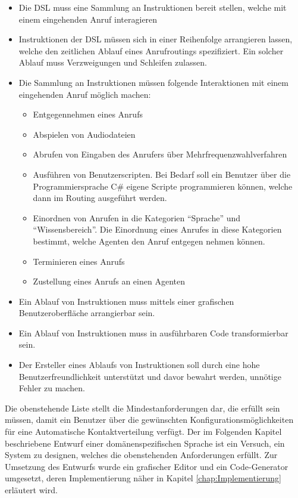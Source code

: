 \begin{itemize}
\item Die DSL muss eine Sammlung an Instruktionen bereit stellen, welche mit einem eingehenden Anruf interagieren
\item Instruktionen der DSL müssen sich in einer Reihenfolge arrangieren lassen, welche den zeitlichen Ablauf eines Anrufroutings spezifiziert. Ein solcher Ablauf muss Verzweigungen und Schleifen zulassen.
\item Die Sammlung an Instruktionen müssen folgende Interaktionen mit einem eingehenden Anruf möglich machen:
	\begin{itemize}
	\item Entgegennehmen eines Anrufs
	\item Abspielen von Audiodateien 
	\item Abrufen von Eingaben des Anrufers über Mehrfrequenzwahlverfahren
	\item Ausführen von Benutzerscripten. Bei Bedarf soll ein Benutzer über die Programmiersprache C\# eigene Scripte programmieren können, welche dann im Routing ausgeführt werden.
	\item Einordnen von Anrufen in die Kategorien ``Sprache'' und ``Wissensbereich''. Die Einordnung eines Anrufes in diese Kategorien bestimmt, welche Agenten den Anruf entgegen nehmen können.
	\item Terminieren eines Anrufs
	\item Zustellung eines Anrufs an einen Agenten
	\end{itemize}
\item Ein Ablauf von Instruktionen muss mittels einer grafischen Benutzeroberfläche arrangierbar sein.
\item Ein Ablauf von Instruktionen muss in ausführbaren Code transformierbar sein.
\item Der Ersteller eines Ablaufs von Instruktionen soll durch eine hohe Benutzerfreundlichkeit unterstützt und davor bewahrt werden, unnötige Fehler zu machen.  
\end{itemize}
Die obenstehende Liste stellt die Mindestanforderungen dar, die erfüllt sein müssen, damit ein Benutzer über die gewünschten Konfigurationsmöglichkeiten für eine Automatische Kontaktverteilung verfügt. Der im Folgenden Kapitel beschriebene Entwurf einer domänenspezifischen Sprache ist ein Versuch, ein System zu designen, welches die obenstehenden Anforderungen erfüllt. Zur Umsetzung des Entwurfs wurde ein grafischer Editor und ein Code-Generator umgesetzt, deren Implementierung näher in Kapitel \ref{chap:Implementierung} erläutert wird.

